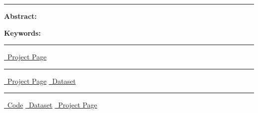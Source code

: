 \newcommand{\stddev}[1]{\textcolor{gray}{\scalebox{.8}{$\pm$#1}}}
\newcommand{\circlednum}[1]{\tikz[baseline=(char.base)]{\node[shape=circle,draw=teal,fill=teal!15,inner sep=1pt,text=teal!90!black] (char) {#1};}}
\renewcommand{\maketitle}{ \thispagestyle{firstpage} \begin{tcolorbox}[ breakable, colback=lightbluebg, colframe=blueframe, arc=3mm, boxrule=0.5pt, left=12pt, right=12pt, top=12pt, bottom=12pt, width=\textwidth, boxsep=5pt ] \noindent {\sffamily\Large\bfseries\color{darkblue}\@title\par} \vspace{0.6em} \noindent \parbox{\textwidth}{\@author}\par \vspace{1.2ex} {\color{dividercolor}\rule{\linewidth}{0.5pt}}\par \vspace{1.2ex} \ifx\@abstract\@empty\else \noindent\parbox{\textwidth}{ {\sffamily\bfseries Abstract:}\quad \@abstract }\par \vspace{1ex} \fi \ifx\@keywords\@empty\else \noindent\parbox{\textwidth}{ {\sffamily\bfseries Keywords:}\quad \@keywords }\par \vspace{1.5ex} \fi \ifx\@codelink\@empty \ifx\@datasetlink\@empty \ifx\@projectlink\@empty \else \vspace{-1.1em} {\color{dividercolor}\rule{\linewidth}{0.5pt}} \vspace{-0.6em} \centering \sffamily\small \href{\@projectlink}{\faGlobe\ Project Page} \par \fi \else \vspace{-1.1em} {\color{dividercolor}\rule{\linewidth}{0.5pt}} \vspace{-0.6em} \centering \sffamily\small \ifx\@projectlink\@empty\else \href{\@projectlink}{\faGlobe\ Project Page}\hspace{1.5em} \fi \href{\@datasetlink}{\faDatabase\ Dataset} \par \fi \else \vspace{-1.1em} {\color{dividercolor}\rule{\linewidth}{0.5pt}} \vspace{-0.6em} \centering \sffamily\small \href{\@codelink}{\faGithub\ Code} \ifx\@datasetlink\@empty\else \hspace{1.5em}\href{\@datasetlink}{\faDatabase\ Dataset} \fi \ifx\@projectlink\@empty\else \hspace{1.5em}\href{\@projectlink}{\faGlobe\ Project Page} \fi \par \fi \end{tcolorbox} }
\maketitle

